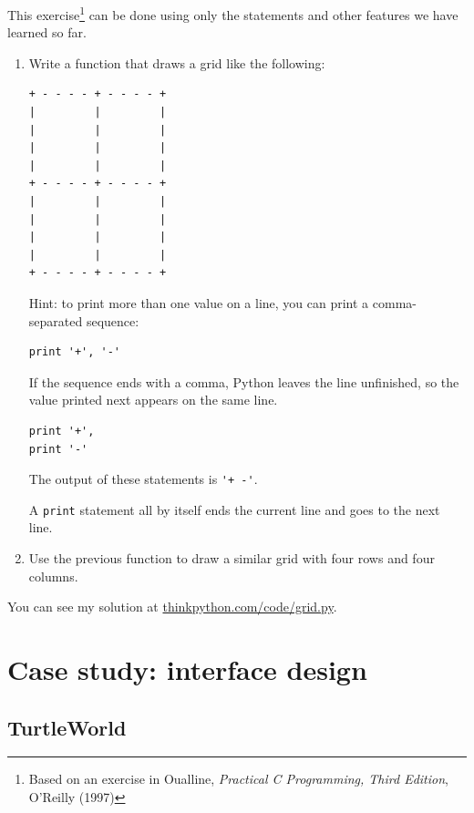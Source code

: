\documentclass[10pt]{book}
\begin{document}
\begin{ex}
This exercise\footnote{Based on an exercise in Oualline, {\em
    Practical C Programming, Third Edition}, O'Reilly (1997)} can be
done using only the statements and other features we have learned so
far.  


\begin{enumerate}

\item Write a function that draws a grid like the
  following:

\beforeverb
\begin{verbatim}
+ - - - - + - - - - +
|         |         |
|         |         |
|         |         |
|         |         |
+ - - - - + - - - - +
|         |         |
|         |         |
|         |         |
|         |         |
+ - - - - + - - - - +
\end{verbatim}
\afterverb
%
Hint: to print more than one value on a line, you can print
a comma-separated sequence:

\beforeverb
\begin{verbatim}
print '+', '-'
\end{verbatim}
\afterverb
%
If the sequence ends with a comma, Python leaves the line unfinished,
so the value printed next appears on the same line.

\beforeverb
\begin{verbatim}
print '+', 
print '-'
\end{verbatim}
\afterverb
%
The output of these statements is \verb"'+ -'".

A {\tt print} statement all by itself ends the current line and
goes to the next line.

\item Use the previous function to draw a similar grid
with four rows and four columns.

\end{enumerate}

You can see my solution at \url{thinkpython.com/code/grid.py}.

\end{ex}





\chapter{Case study: interface design}
\label{turtlechap}

\section{TurtleWorld}
\end{document}
